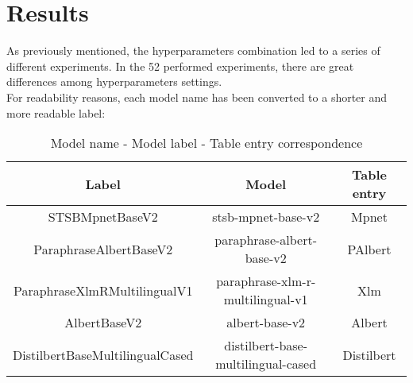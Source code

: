 \documentclass[\main/main.tex]{subfiles}
\begin{document}
\section{Results}
As previously mentioned, the hyperparameters combination led to a series of different experiments. In the 52 performed experiments, there are great differences among hyperparameters settings.\\
For readability reasons, each model name has been converted to a shorter and more readable label:
\begin{table}[H]
    \centering
    \begin{tabular}{| c | c | c |}
        \hline
        Label & Model & Table entry\\ 
        \hline
        STSBMpnetBaseV2 & stsb-mpnet-base-v2 & Mpnet     \\
        ParaphraseAlbertBaseV2 & paraphrase-albert-base-v2 & PAlbert     \\
        ParaphraseXlmRMultilingualV1 & paraphrase-xlm-r-multilingual-v1 & Xlm    \\
        AlbertBaseV2 & albert-base-v2 & Albert     \\
        DistilbertBaseMultilingualCased & distilbert-base-multilingual-cased & Distilbert     \\ 
        \hline
    \end{tabular}
    \caption{Model name - Model label - Table entry correspondence}
    \label{tab:model_name_model_label}
\end{table}
\end{document}
